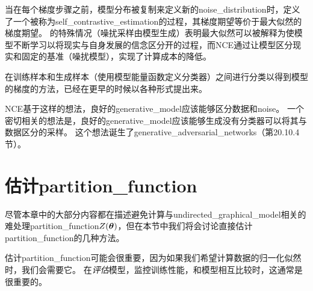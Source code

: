 当在每个梯度步骤之前，模型分布被复制来定义新的\gls{noise_distribution}时，定义了一个被称为\gls{self_contrastive_estimation}的过程，其梯度期望等价于最大似然的梯度期望\citep{Goodfellow-ICLR2015}。
的特殊情况（噪扰采样由模型生成）表明最大似然可以被解释为使模型不断学习以将现实与自身发展的信念区分开的过程，而\gls{NCE}通过让模型区分现实和固定的基准（噪扰模型），实现了计算成本的降低。


在训练样本和生成样本（使用模型能量函数定义分类器）之间进行分类以得到模型的梯度的方法，已经在更早的时候以各种形式提出来\citep{Welling2003b,Bengio-2009-book}。


\gls{NCE}基于这样的想法，良好的\gls{generative_model}应该能够区分数据和\gls{noise}。
一个密切相关的想法是，良好的\gls{generative_model}应该能够生成没有分类器可以将其与数据区分的采样。
这个想法诞生了\gls{generative_adversarial_networks}（第20.10.4节）。


\section{估计\gls{partition_function}}
\label{sec:estimating_the_partition_function}
尽管本章中的大部分内容都在描述避免计算与\gls{undirected_graphical_model}相关的难处理\gls{partition_function}$Z(\boldsymbol{\theta})$，但在本节中我们将会讨论直接估计\gls{partition_function}的几种方法。


估计\gls{partition_function}可能会很重要，因为如果我们希望计算数据的归一化似然时，我们会需要它。
在\emph{评估}模型，监控训练性能，和模型相互比较时，这通常是很重要的。


